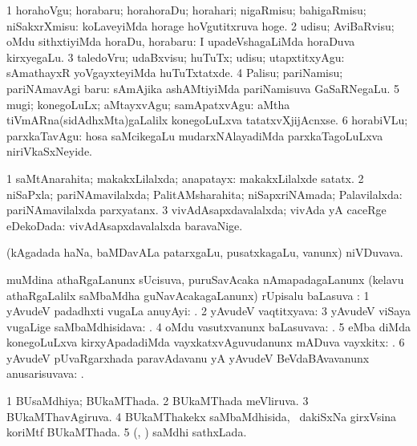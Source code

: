 \noindent 
\gl{\akirx}
\bmng
\bnum
\num{1} horahoVgu; horabaru; horahoraDu; horahari; nigaRmisu; bahigaRmisu; niSakxrXmisu:  koLaveyiMda horage hoVgutitxruva hoge. 
\num{2} udisu; AviBaRvisu; oMdu sithxtiyiMda horaDu, horabaru:  I upadeVshagaLiMda horaDuva kirxyegaLu. 
\num{3} taledoVru; udaBxvisu; huTuTx; udisu; utapxtitxyAgu:  sAmathayxR yoVgayxteyiMda huTuTxtatxde. 
\num{4} Palisu; pariNamisu; pariNAmavAgi baru:  sAmAjika ashAMtiyiMda pariNamisuva GaSaRNegaLu. 
\num{5} mugi; konegoLuLx; aMtayxvAgu; samApatxvAgu:  aMtha tiVmARna(sidAdhxMta)gaLalilx konegoLuLxva tatatxvXjijAcnxse. 
\num{6} horabiVLu; parxkaTavAgu:  hosa saMcikegaLu mudarxNAlayadiMda parxkaTagoLuLxva niriVkaSxNeyide. 
\enum
\emng
\eentry

\bentry
{}
\gl{\gu}
\bmng
\bnum
\num{1} saMtAnarahita; makakxLilalxda; anapatayx:  makakxLilalxde satatx. 
\num{2} niSaPxla; pariNAmavilalxda; PalitAMsharahita; niSapxriNAmada; Palavilalxda:  pariNAmavilalxda parxyatanx. 
\num{3} vivAdAsapxdavalalxda; vivAda yA caceRge eDekoDada:  vivAdAsapxdavalalxda baravaNige. 
\enum
\emng
\eentry

\bentry
{}
\gl{\nA}
\bmng
(kAgadada haNa, baMDavALa patarxgaLu, pusatxkagaLu, \mo vanunx) niVDuvava. 
\emng
\eentry

\bentry
{}
\gl{\uparx}
\bmng
muMdina athaRgaLanunx sUcisuva, puruSavAcaka nAmapadagaLanunx (kelavu athaRgaLalilx saMbaMdha guNavAcakagaLanunx) rUpisalu baLasuva \uparx: 
\bnum
\num{1} yAvudeV padadhxti \mo vugaLa anuyAyi: . 
\num{2} yAvudeV vaqtitxyava:  
\num{3} yAvudeV viSaya \mo vugaLige saMbaMdhisidava: . 
\num{4} oMdu vasutxvanunx baLasuvava: . 
\num{5}  eMba \uparx diMda konegoLuLxva kirxyApadadiMda vayxkatxvAguvudanunx mADuva vayxkitx: . 
\num{6} yAvudeV pUvaRgarxhada paravAdavanu yA yAvudeV BeVdaBAvavanunx anusarisuvava: . 
\enum
\emng
\eentry

\bentry
{}
\gl{\gu}
\bmng
\bnum
\num{1} BUsaMdhiya; BUkaMThada. 
\num{2} BUkaMThada meVliruva. 
\num{3} BUkaMThavAgiruva. 
\num{4} BUkaMThakekx saMbaMdhisida, \kanmu\ dakiSxNa girxVsina koriMtf BUkaMThada. 
\num{5} (\aMrashA, \savi) saMdhi sathxLada. 
\enum
\emng
\eentry

